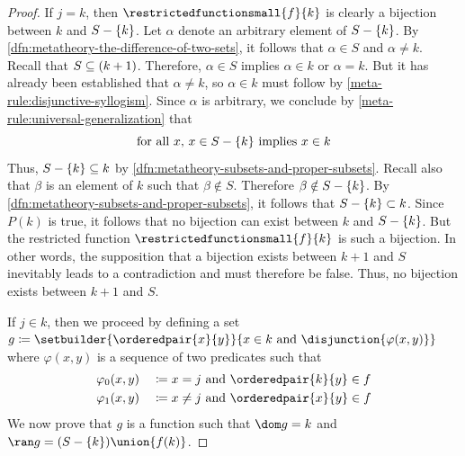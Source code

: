 \begin{proof}
    \vspace{0.3cm}
    \noindent
    If \( j = k \), then \( \restrictedfunctionsmall{f}{k} \) is clearly a bijection between \( k \) and \( S - \mleft\{ k \mright\} \).
    Let \( \alpha \) denote an arbitrary element of \( S - \mleft\{ k \mright\} \).
    By \cref{dfn:metatheory-the-difference-of-two-sets}, it follows that \( \alpha \in S \) and \( \alpha \neq k \).
    Recall that \( S \subseteq \mleft( k + 1 \mright) \).
    Therefore, \( \alpha \in S \) implies \( \alpha \in k \) or \( \alpha = k \).
    But it has already been established that \( \alpha \neq k \), so \( \alpha \in k \) must follow by \cref{meta-rule:disjunctive-syllogism}.
    Since \( \alpha \) is arbitrary, we conclude by \cref{meta-rule:universal-generalization} that
    \begin{equation*}
        \text{for all \( x \), \( x \in S - \mleft\{ k \mright\}  \) implies \( x \in k \)}
    \end{equation*}
    Thus, \( S - \mleft\{ k \mright\} \subseteq k\) by \cref{dfn:metatheory-subsets-and-proper-subsets}.
    Recall also that \( \beta \) is an element of \( k \) such that \( \beta \notin S \).
    Therefore \( \beta \notin S - \mleft\{ k \mright\} \).
    By \cref{dfn:metatheory-subsets-and-proper-subsets}, it follows that \( S - \mleft\{ k \mright\} \subset k \).
    Since \( P(k) \) is true, it follows that no bijection can exist between \( k \) and \( S - \mleft\{ k \mright\} \).
    But the restricted function \( \restrictedfunctionsmall{f}{k} \) is such a bijection.
    In other words, the supposition that a bijection exists between \( k + 1 \) and \( S \) inevitably leads to a contradiction and must therefore be false.
    Thus, no bijection exists between \( k + 1 \) and \( S \).

    \vspace{0.3cm}
    \noindent
    If \( j \in k \), then we proceed by defining a set \( g \coloneq \setbuilder{\orderedpair{x}{y}}{x \in k \ \text{and} \ \disjunction{\varphi(x, y)}} \) where
    \( \varphi(x, y) \) is a sequence of two predicates such that
    \begin{alignat*}{2}
        &\varphi_{0}(x, y) &&\coloneq \text{\( x = j \) and \( \orderedpair{k}{y} \in f \)}\\
        &\varphi_{1}(x, y) &&\coloneq \text{\( x \neq j \) and \( \orderedpair{x}{y} \in f \)}
    \end{alignat*}
    We now prove that \( g \) is a function such that \( \dom g = k \) and \( \ran g = \mleft( S - \mleft\{ k \mright\} \mright) \union \mleft\{ f(k) \mright\}  \).


\end{proof}
